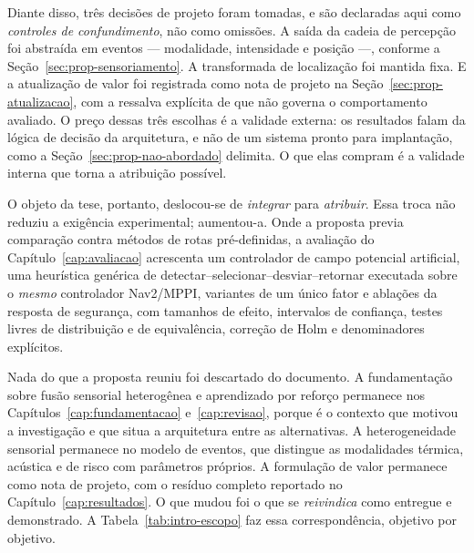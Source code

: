 Diante disso, três decisões de projeto foram tomadas, e são declaradas aqui como
\emph{controles de confundimento}, não como omissões. A saída da cadeia de percepção
foi abstraída em eventos --- modalidade, intensidade e posição ---, conforme a
Seção~\ref{sec:prop-sensoriamento}. A transformada de localização foi mantida fixa.
E a atualização de valor foi registrada como nota de projeto na
Seção~\ref{sec:prop-atualizacao}, com a ressalva explícita de que não governa o
comportamento avaliado. O preço dessas três escolhas é a validade externa: os
resultados falam da lógica de decisão da arquitetura, e não de um sistema pronto para
implantação, como a Seção~\ref{sec:prop-nao-abordado} delimita. O que elas compram é
a validade interna que torna a atribuição possível.

O objeto da tese, portanto, deslocou-se de \emph{integrar} para \emph{atribuir}. Essa
troca não reduziu a exigência experimental; aumentou-a. Onde a proposta previa
comparação contra métodos de rotas pré-definidas, a avaliação do
Capítulo~\ref{cap:avaliacao} acrescenta um controlador de campo potencial artificial,
uma heurística genérica de detectar--selecionar--desviar--retornar executada sobre o
\emph{mesmo} controlador Nav2/MPPI, variantes de um único fator e ablações da
resposta de segurança, com tamanhos de efeito, intervalos de confiança, testes
livres de distribuição e de equivalência, correção de Holm e denominadores
explícitos.

Nada do que a proposta reuniu foi descartado do documento. A fundamentação sobre
fusão sensorial heterogênea e aprendizado por reforço permanece nos
Capítulos~\ref{cap:fundamentacao} e~\ref{cap:revisao}, porque é o contexto que
motivou a investigação e que situa a arquitetura entre as alternativas. A
heterogeneidade sensorial permanece no modelo de eventos, que distingue as
modalidades térmica, acústica e de risco com parâmetros próprios. A formulação de
valor permanece como nota de projeto, com o resíduo completo reportado no
Capítulo~\ref{cap:resultados}. O que mudou foi o que se \emph{reivindica} como
entregue e demonstrado. A Tabela~\ref{tab:intro-escopo} faz essa correspondência,
objetivo por objetivo.

